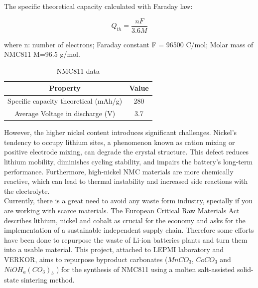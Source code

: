 \documentclass{article}
\begin{document}
The specific theoretical capacity calculated with Faraday law:

\begin{equation}
Q_{th} = \frac{n F}{3.6 M} 
\end{equation}

where n: number of electrons;
Faraday constant F = 96500 C/mol;
Molar mass of NMC811 M=96.5 g/mol.\\

\begin{center}
  
  \begin{table}[H]
    \centering
    \begin{tabular}{|c|c|}
        \hline
        \textbf{Property} & \textbf{Value} \\ 
        \hline
        Specific capacity theoretical (mAh/g) & 280 \\ 
        \hline
        Average Voltage in discharge (V) & 3.7 \\ 
        \hline
    \end{tabular}
    \caption{NMC811 data \cite{NMC811}}
    \label{NMC811_properties}
\end{table}
\end {center}


However, the higher nickel content introduces significant challenges. Nickel's tendency to occupy lithium sites, a phenomenon known as cation mixing or positive electrode mixing, can degrade the crystal structure. This defect reduces lithium mobility, diminishes cycling stability, and impairs the battery's long-term performance. Furthermore, high-nickel NMC materials are more chemically reactive, which can lead to thermal instability and increased side reactions with the electrolyte.\cite{NMCintro} \\

Currently, there is a great need to avoid any waste form industry,
specially if you are working with scarce materials. The European Critical Raw Materials Act describes lithium, nickel and cobalt as crucial for the economy and asks for the implementation of a sustainable independent supply chain.\cite{RMA} Therefore some efforts
have been done to repurpose the waste of Li-ion batteries plants and turn them into a usable material. This project, attached to LEPMI laboratory and VERKOR, aims to repurpose byproduct carbonates (\({MnCO}_{3}\), \({CoCO}_{3}\) and \({NiOH}_{a}{({CO}_{3})}_{b}\) ) for the synthesis of NMC811 using a molten salt-assisted solid-state sintering method. \\
\end{document}
